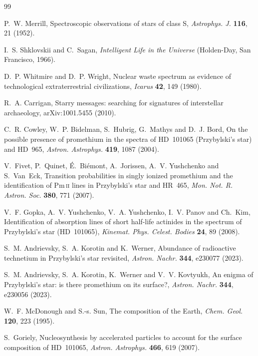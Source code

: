 \documentclass[3p,11pt]{elsarticle}
\newcommand{\ion}[2]{#1\,\textsc{#2}}
\begin{document}
\begin{thebibliography}{99}\small\raggedright
\setlength{\itemsep}{1pt}

P.~W. Merrill, Spectroscopic observations of stars of class S, \emph{Astrophys. J.}
\textbf{116}, 21 (1952).

I.~S. Shklovskii and C.~Sagan, \emph{Intelligent Life in the Universe} (Holden-Day, San
Francisco, 1966).

D.~P. Whitmire and D.~P. Wright, Nuclear waste spectrum as evidence of technological
extraterrestrial civilizations, \emph{Icarus} \textbf{42}, 149 (1980).

R.~A. Carrigan, Starry messages: searching for signatures of interstellar archaeology,
arXiv:1001.5455 (2010).

C.~R. Cowley, W.~P. Bidelman, S.~Hubrig, G.~Mathys and D.~J. Bord, On the possible
presence of promethium in the spectra of HD~101065 (Przybylski's star) and HD~965,
\emph{Astron. Astrophys.} \textbf{419}, 1087 (2004).

V.~Fivet, P.~Quinet, \'E.~Bi\'emont, A.~Jorissen, A.~V. Yushchenko and S.~Van~Eck,
Transition probabilities in singly ionized promethium and the identification of
\ion{Pm}{ii} lines in Przybylski's star and HR~465, \emph{Mon. Not. R. Astron. Soc.}
\textbf{380}, 771 (2007).

V.~F. Gopka, A.~V. Yushchenko, V.~A. Yushchenko, I.~V. Panov and Ch.~Kim,
Identification of absorption lines of short half-life actinides in the spectrum of
Przybylski's star (HD~101065), \emph{Kinemat. Phys. Celest. Bodies} \textbf{24}, 89
(2008).

S.~M. Andrievsky, S.~A. Korotin and K.~Werner, Abundance of radioactive technetium in
Przybylski's star revisited, \emph{Astron. Nachr.} \textbf{344}, e230077 (2023).

S.~M. Andrievsky, S.~A. Korotin, K.~Werner and V.~V. Kovtyukh, An enigma of
Przybylski's star: is there promethium on its surface?, \emph{Astron. Nachr.}
\textbf{344}, e230056 (2023).

W.~F. McDonough and S.-s. Sun, The composition of the Earth, \emph{Chem. Geol.}
\textbf{120}, 223 (1995).

S.~Goriely, Nucleosynthesis by accelerated particles to account for the surface
composition of HD~101065, \emph{Astron. Astrophys.} \textbf{466}, 619 (2007).


\end{thebibliography}
\end{document}
